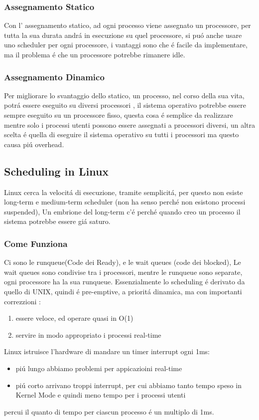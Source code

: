     \subsubsection*{Assegnamento Statico}
    Con l' assegnamento statico, ad ogni processo viene assegnato un processore, per tutta la sua durata andrá in esecuzione su quel
    processore, si puó anche usare uno scheduler per ogni processore, i vantaggi sono che é facile da implementare, ma il problema
    é che un processore potrebbe rimanere idle.
    \subsubsection*{Assegnamento Dinamico}
    Per migliorare lo svantaggio dello statico, un processo, nel corso della sua vita, potrá essere eseguito su diversi processori
    , il sistema operativo potrebbe essere sempre eseguito su un processore fisso, questa cosa é semplice da realizzare mentre solo i processi
    utenti possono essere assegnati a processori diversi, un altra scelta é quella di eseguire il sistema operativo su tutti i processori
    ma questo causa piú overhead.
    \subsection{Scheduling in Linux}
    Linux cerca la velocitá di esecuzione, tramite semplicitá, per questo non esiste long-term e medium-term scheduler (non
    ha senso perché non esistono processi suspended), Un embrione del long-term c'é perché quando creo un processo il sistema
    potrebbe essere giá saturo.
    \subsubsection*{Come Funziona}
    Ci sono le runqueue(Code dei Ready), e le wait queues (code dei blocked), Le wait queues sono condivise tra i processori,
    mentre le runqueue sono separate, ogni processore ha la sua runqueue. Essenzialmente lo scheduling é derivato da quello
    di UNIX, quindi é pre-emptive, a prioritá dinamica, ma con importanti correzzioni :
    \begin{enumerate}
        \item essere veloce, ed operare quasi in O(1)
        \item servire in modo appropriato i processi real-time
    \end{enumerate}
    Linux istruisce l'hardware di mandare un timer interrupt ogni 1ms:
    \begin{itemize}
        \item piú lungo abbiamo problemi per appicazioini real-time
        \item piú corto arrivano troppi interrupt, per cui abbiamo tanto tempo speso in Kernel Mode e quindi meno tempo
        per i processi utenti
    \end{itemize}
    percui il quanto di tempo per ciascun processo é un multiplo di 1ms.\\


